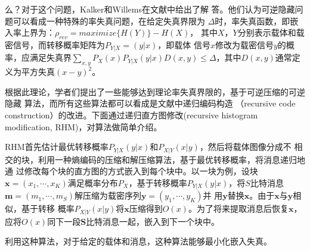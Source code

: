 \begin{itemize}
    么？对于这个问题，Kalker和Willems在文献\cite{kalker2002capacity}中给出了解
    答。他们认为可逆隐藏问题可以看成一种特殊的率失真问题，在给定失真界限为
    $\Delta$时，率失真函数，即嵌入率上界为：$\rho_{rev}=maximize\{H(Y)\}-H(X)$，
    其中$X$，$Y$分别表示载体和载密信号，而转移概率矩阵为$P_{Y|X}=(y|x)$，即载体
    信号$x$修改为载密信号$y$的概率，应满足失真界$\sum_{x,y}P_X(x)P_{Y|X}(y|x)
    D(x,y)\le\Delta$，其中$D(x,y)$通常定义为平方失真$(x-y)^2$。
    \par
    根据此理论，学者们提出了一些能够达到理论率失真界限的，基于可逆压缩的可逆隐藏
    算法，而所有这些算法都可以看成是文献\cite{kalker2002capacity}中递归编码构造
    （recursive code construction）的改进。下面通过递归直方图修改(recursive 
    histogram modification, RHM)，对算法做简单介绍。
    \par
    RHM首先估计最优转移概率$P_{Y|X}(y|x)$和$P_{X|Y}(x|y)$，然后将载体图像分成不
    相交的块，利用一种熵编码的压缩和解压缩算法，基于最优转移概率，将消息递归地通
    过修改每个块的直方图的方式嵌入到每个块中。以一块为例，设块$\textbf{x}=(x_1,
    \cdots,x_K)$满足概率分布$P_X$，基于转移概率$P_{Y|X}(y|x)$，将$S$比特消息
    $\textbf{m}=(m_1,\cdots,m_S)$解压缩为载密序列$\textbf{y}=(y_1,\cdots,y_K)$并
    用$\textbf{y}$替换$\textbf{x}$。由于$\textbf{x}$与$\textbf{y}$相似，基于转移
    概率$P_{X|Y}(x|y)$将$\textbf{x}$压缩得到$O(x)$。为了将来提取消息后恢复$\textbf
    {x}$，应将$O(x)$同下一段$\textbf{S}$比特消息一起，嵌入到下一个块中。
    \par
    利用这种算法，对于给定的载体和消息，这种算法能够最小化嵌入失真。
\end{itemize}

